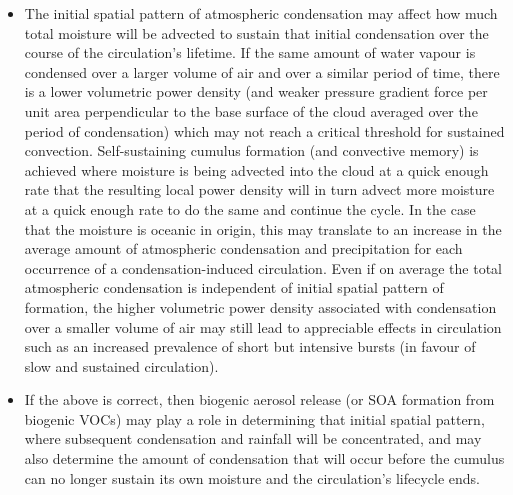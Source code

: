 \begin{itemize}
	\item The initial spatial pattern of atmospheric condensation may affect how much total moisture will be advected to sustain that initial condensation over the course of the circulation’s lifetime. If the same amount of water vapour is condensed over a larger volume of air and over a similar period of time, there is a lower volumetric power density (and weaker pressure gradient force per unit area perpendicular to the base surface of the cloud averaged over the period of condensation) which may not reach a critical threshold for sustained convection. Self-sustaining cumulus formation (and convective memory) is achieved where moisture is being advected into the cloud at a quick enough rate that the resulting local power density will in turn advect more moisture at a quick enough rate to do the same and continue the cycle. In the case that the moisture is oceanic in origin, this may translate to an increase in the average amount of atmospheric condensation and precipitation for each occurrence of a condensation-induced circulation. Even if on average the total atmospheric condensation is independent of initial spatial pattern of formation, the higher volumetric power density associated with condensation over a smaller volume of air may still lead to appreciable effects in circulation such as an increased prevalence of short but intensive bursts (in favour of slow and sustained circulation).
	\item If the above is correct, then biogenic aerosol release (or \ac{SOA} formation from biogenic \ac{VOC}s) may play a role in determining that initial spatial pattern, where subsequent condensation and rainfall will be concentrated, and may also determine the amount of condensation that will occur before the cumulus can no longer sustain its own moisture and the circulation’s lifecycle ends.

\end{itemize}
